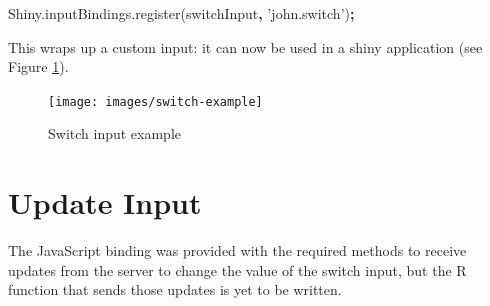 \documentclass[10pt,]{krantz}
\makeatletter
\newenvironment{Shaded}{\begin{snugshade}}{\end{snugshade}}
\newcommand{\AttributeTok}[1]{\textcolor[rgb]{0.61,0.61,0.61}{#1}}
\newcommand{\ControlFlowTok}[1]{\textcolor[rgb]{0.27,0.27,0.27}{\textbf{#1}}}
\newcommand{\KeywordTok}[1]{\textcolor[rgb]{0.27,0.27,0.27}{\textbf{#1}}}
\newcommand{\NormalTok}[1]{#1}
\newcommand{\OperatorTok}[1]{\textcolor[rgb]{0.43,0.43,0.43}{\textbf{#1}}}
\newcommand{\OtherTok}[1]{\textcolor[rgb]{0.37,0.37,0.37}{#1}}
\newcommand{\StringTok}[1]{\textcolor[rgb]{0.5,0.5,0.5}{#1}}
\newcommand{\VariableTok}[1]{\textcolor[rgb]{0,0,0}{#1}}
\newenvironment{kframe}{%
\medskip{}
\setlength{\fboxsep}{.8em}
 \def\at@end@of@kframe{}%
 \ifinner\ifhmode%
  \def\at@end@of@kframe{\end{minipage}}%
  \begin{minipage}{\columnwidth}%
 \fi\fi%
 \def\FrameCommand##1{\hskip\@totalleftmargin \hskip-\fboxsep
 \colorbox{shadecolor}{##1}\hskip-\fboxsep
     \hskip-\linewidth \hskip-\@totalleftmargin \hskip\columnwidth}%
 \MakeFramed {\advance\hsize-\width
   \@totalleftmargin\z@ \linewidth\hsize
   \@setminipage}}%
 {\par\unskip\endMakeFramed%
 \at@end@of@kframe}
\renewenvironment{Shaded}{\begin{kframe}}{\end{kframe}}
\makeatother
\begin{document}
\begin{Shaded}
\begin{Highlighting}[]
\VariableTok{Shiny}\NormalTok{.}\VariableTok{inputBindings}\NormalTok{.}\AttributeTok{register}\NormalTok{(switchInput}\OperatorTok{,} \StringTok{'john.switch'}\NormalTok{)}\OperatorTok{;}
\end{Highlighting}
\end{Shaded}

This wraps up a custom input: it can now be used in a shiny application (see Figure \ref{fig:switch-example}).

\begin{Shaded}
\end{Shaded}

\begin{figure}[H]

{\centering \texttt{[image: images/switch-example]} 

}

\caption{Switch input example}\label{fig:switch-example}
\end{figure}

\hypertarget{shiny-input-update}{%
\section{Update Input}\label{shiny-input-update}}

The JavaScript binding was provided with the required methods to receive updates from the server to change the value of the switch input, but the R function that sends those updates is yet to be written.
\end{document}
